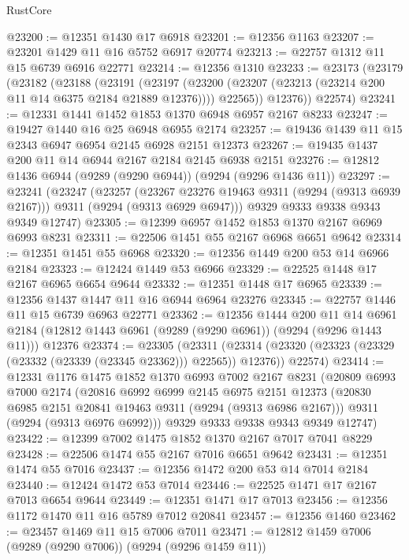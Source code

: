 \begin{lexlean}{RustCore}
\begin{coremodule}
@23200 := @12351 @1430 @17 @6918
@23201 := @12356 @1163
@23207 := @23201 @1429 @11 @16 @5752 @6917 @20774
@23213 := @22757 @1312 @11 @15 @6739 @6916 @22771
@23214 := @12356 @1310
@23233 := @23173
    (@23179
      (@23182
        (@23188
          (@23191
            (@23197
              (@23200 (@23207 (@23213 (@23214 @200 @11 @14 @6375 @2184 @21889 @12376))))
              @22565))
          @12376))
      @22574)
@23241 := @12331 @1441 @1452 @1853 @1370 @6948 @6957 @2167 @8233
@23247 := @19427 @1440 @16 @25 @6948 @6955 @2174
@23257 := @19436 @1439 @11 @15 @2343 @6947 @6954 @2145 @6928 @2151 @12373
@23267 := @19435 @1437 @200 @11 @14 @6944 @2167 @2184 @2145 @6938 @2151
@23276 := @12812 @1436 @6944 (@9289 (@9290 @6944)) (@9294 (@9296 @1436 @11))
@23297 := @23241
    (@23247
      (@23257
        (@23267 @23276 @19463 @9311 (@9294 (@9313 @6939 @2167)))
        @9311
        (@9294 (@9313 @6929 @6947)))
      @9329
      @9333
      @9338
      @9343
      @9349
      @12747)
@23305 := @12399 @6957 @1452 @1853 @1370 @2167 @6969 @6993 @8231
@23311 := @22506 @1451 @55 @2167 @6968 @6651 @9642
@23314 := @12351 @1451 @55 @6968
@23320 := @12356 @1449 @200 @53 @14 @6966 @2184
@23323 := @12424 @1449 @53 @6966
@23329 := @22525 @1448 @17 @2167 @6965 @6654 @9644
@23332 := @12351 @1448 @17 @6965
@23339 := @12356 @1437 @1447 @11 @16 @6944 @6964 @23276
@23345 := @22757 @1446 @11 @15 @6739 @6963 @22771
@23362 := @12356
    @1444
    @200
    @11
    @14
    @6961
    @2184
    (@12812 @1443 @6961 (@9289 (@9290 @6961)) (@9294 (@9296 @1443 @11)))
    @12376
@23374 := @23305
    (@23311
      (@23314 (@23320 (@23323 (@23329 (@23332 (@23339 (@23345 @23362))) @22565)) @12376))
      @22574)
@23414 := @12331
    @1176
    @1475
    @1852
    @1370
    @6993
    @7002
    @2167
    @8231
    (@20809
      @6993
      @7000
      @2174
      (@20816
        @6992
        @6999
        @2145
        @6975
        @2151
        @12373
        (@20830 @6985 @2151 @20841 @19463 @9311 (@9294 (@9313 @6986 @2167)))
        @9311
        (@9294 (@9313 @6976 @6992)))
      @9329
      @9333
      @9338
      @9343
      @9349
      @12747)
@23422 := @12399 @7002 @1475 @1852 @1370 @2167 @7017 @7041 @8229
@23428 := @22506 @1474 @55 @2167 @7016 @6651 @9642
@23431 := @12351 @1474 @55 @7016
@23437 := @12356 @1472 @200 @53 @14 @7014 @2184
@23440 := @12424 @1472 @53 @7014
@23446 := @22525 @1471 @17 @2167 @7013 @6654 @9644
@23449 := @12351 @1471 @17 @7013
@23456 := @12356 @1172 @1470 @11 @16 @5789 @7012 @20841
@23457 := @12356 @1460
@23462 := @23457 @1469 @11 @15 @7006 @7011
@23471 := @12812 @1459 @7006 (@9289 (@9290 @7006)) (@9294 (@9296 @1459 @11))

\end{coremodule}
\end{lexlean}
